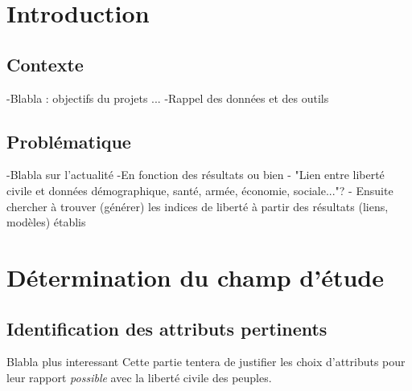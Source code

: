 \section{Introduction}

\subsection{Contexte}
-Blabla : objectifs du projets ...
-Rappel des données et des outils
\subsection{Problématique}
-Blabla sur l'actualité
-En fonction des résultats ou bien 
- "Lien entre liberté civile et données démographique, santé, armée, économie, sociale..."?
- Ensuite chercher à trouver (générer) les indices de liberté à partir des résultats (liens, modèles) établis

\section{Détermination du champ d'étude}
\subsection{Identification des attributs pertinents}
Blabla plus interessant
Cette partie tentera de justifier les choix d'attributs pour leur rapport \emph{possible} avec la liberté civile des peuples.
